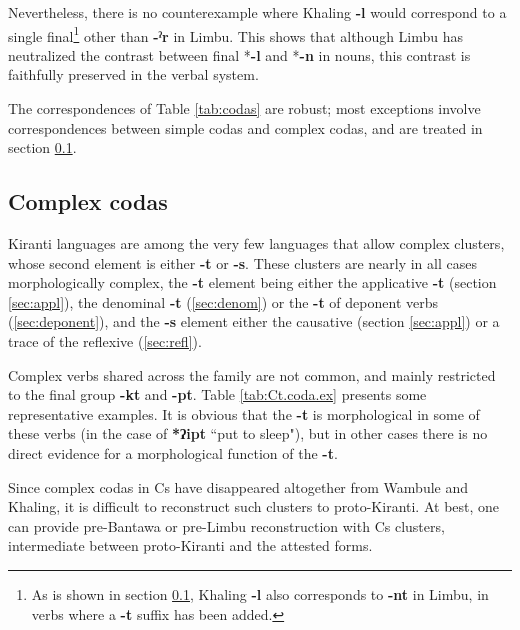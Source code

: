 \documentclass[oldfontcommands,oneside,a4paper,11pt]{article}
\newcommand{\ipa}[1]{\textbf{{\phon\mbox{#1}}}} %
\begin{document}
Nevertheless, there is no counterexample where Khaling \ipa{-l} would correspond to a single final\footnote{As is shown in section \ref{sec:Ct}, Khaling \ipa{-l} also corresponds to \ipa{-nt} in Limbu, in verbs where a \ipa{-t} suffix has been added.} other than \ipa{-ˀr} in Limbu. This shows that although Limbu has neutralized the contrast between final *\ipa{-l} and  *\ipa{-n} in nouns, this contrast is faithfully preserved in the verbal system.


The correspondences of Table \ref{tab:codas} are robust; most exceptions involve correspondences between simple codas and complex codas, and are treated in section \ref{sec:Ct}. 

\subsection{Complex codas} \label{sec:Ct}
Kiranti languages are among the very few languages that allow complex clusters, whose second element is either \ipa{-t} or \ipa{-s}. These clusters are nearly in all cases morphologically complex, the \ipa{-t} element being either the applicative \ipa{-t} (section \ref{sec:appl}), the denominal \ipa{-t} (\ref{sec:denom}) or the \ipa{-t} of deponent verbs (\ref{sec:deponent}), and the \ipa{-s} element either the causative (section \ref{sec:appl}) or a trace of the reflexive (\ref{sec:refl}).

Complex verbs shared across the family are not common, and mainly restricted to the final group \ipa{-kt} and \ipa{-pt}. Table \ref{tab:Ct.coda.ex} presents some representative examples. It is obvious that the \ipa{-t} is morphological in some of these verbs (in the case of \ipa{*ʔipt} ``put to sleep"), but in other cases there is no direct evidence for a morphological function of the \ipa{-t}.

Since complex codas in Cs have disappeared altogether from Wambule and Khaling, it is difficult to reconstruct such clusters to proto-Kiranti. At best, one can provide pre-Bantawa or pre-Limbu reconstruction with Cs clusters, intermediate between proto-Kiranti and the attested forms. 
\end{document}
